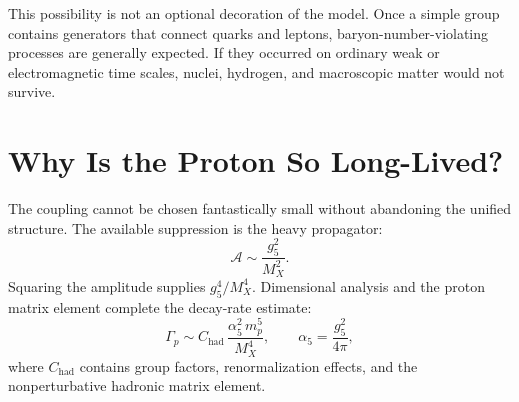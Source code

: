 This possibility is not an optional decoration of the model. Once a simple group contains generators that connect quarks and leptons, baryon-number-violating processes are generally expected. If they occurred on ordinary weak or electromagnetic time scales, nuclei, hydrogen, and macroscopic matter would not survive.

\section{Why Is the Proton So Long-Lived?}

\begin{classroomqa}
\end{classroomqa}

The coupling cannot be chosen fantastically small without abandoning the unified structure. The available suppression is the heavy propagator:
\begin{equation}
\mathcal A
\sim
\frac{g_5^2}{M_X^2}.
\label{eq:l10-amplitude}
\end{equation}
Squaring the amplitude supplies \(g_5^4/M_X^4\). Dimensional analysis and the proton matrix element complete the decay-rate estimate:
\begin{equation}
\Gamma_p
\sim
C_{\mathrm{had}}\,
\frac{\alpha_5^2\,m_p^5}{M_X^4},
\qquad
\alpha_5=\frac{g_5^2}{4\pi},
\label{eq:l10-rate}
\end{equation}
where \(C_{\mathrm{had}}\) contains group factors, renormalization effects, and the nonperturbative hadronic matrix element.


\begin{classroomqa}
\end{classroomqa}

